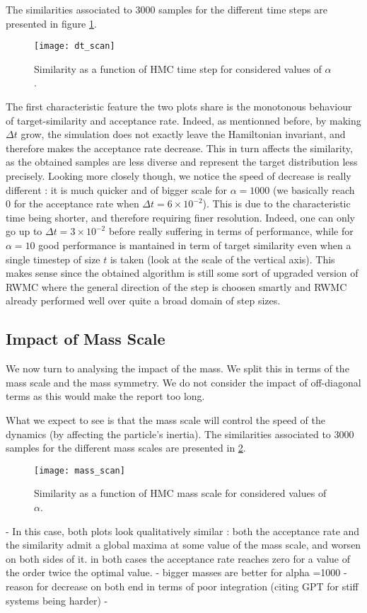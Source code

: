 \documentclass[a4paper, 12pt,oneside]{article}
\begin{document}
			The similarities associated to 3000 samples for the different time steps are presented in figure \ref{fig:dt-scan}.
			\begin{figure}[htb]
				\centering
					\vspace{0em}
					\texttt{[image: dt\_scan]}
					\caption{Similarity as a function of HMC time step for considered values of $\alpha$.}
					\label{fig:dt-scan}
			\end{figure}
			The first characteristic feature the two plots share is the monotonous behaviour of target-similarity and acceptance rate. Indeed, as mentionned before, by making $\Delta t$ grow, the simulation does not exactly leave the Hamiltonian invariant, and therefore makes the acceptance rate decrease. This in turn affects the similarity, as the obtained samples are less diverse and represent the target distribution less precisely.  
			Looking more closely though, we notice the speed of decrease is really different : it is much quicker and of bigger scale for $\alpha=1000$ (we basically reach 0 for the acceptance rate when $\Delta t=6\times 10^{-2}$). This is due to the characteristic time being shorter, and therefore requiring finer resolution. Indeed, one can only go up to $\Delta t=3\times 10^{-2}$ before really suffering in terms of performance, while for $\alpha=10$ good performance is mantained in term of target similarity even when a single timestep of size $t$ is taken (look at the scale of the vertical axis). This makes sense since the obtained algorithm is still some sort of upgraded version of RWMC where the general direction of the step is choosen smartly and RWMC already performed well over quite a broad domain of step sizes.   
			\subsection{Impact of Mass Scale}
			We now turn to analysing the impact of the mass. We split this in terms of the mass scale and the mass symmetry. We do not consider the impact of off-diagonal terms as this would make the report too long. 

			What we expect to see is that the mass scale will control the speed of the dynamics (by affecting the particle's inertia).
			The similarities associated to 3000 samples for the different mass scales are presented in \ref{fig:mass-scan}.
			\begin{figure}[htb]
				\centering
					\vspace{0em}
					\texttt{[image: mass\_scan]}
					\caption{Similarity as a function of HMC mass scale for considered values of $\alpha$.}
					\label{fig:mass-scan}
			\end{figure}
			- In this case, both plots look qualitatively similar : both the acceptance rate and the similarity admit a global maxima at some value of the mass scale, and worsen on both sides of it. in both cases the acceptance rate reaches zero for a value of the order twice the optimal value.  
			- bigger masses are better for alpha =1000
			- reason for decrease on both end in terms of poor integration (citing GPT for stiff systems being harder)
			- 
\end{document}
